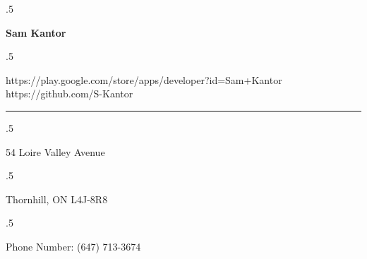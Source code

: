 \documentclass[article]{res}
\begin{document}
 \moveleft.5\hoffset\centerline{\Huge\bf Sam Kantor}
 \moveleft.5\hoffset\centerline{}
 \begin{changemargin}{-0.6cm}{0.5cm} 
 {https://play.google.com/store/apps/developer?id=Sam+Kantor \hspace{43 pt} https://github.com/S-Kantor}
  \end{changemargin}
\begin{changemargin}{-0.7cm}{2.5cm} 
 {\noindent\rule{17cm}{0.5pt} }
 \end{changemargin}


 \moveleft.5\hoffset\centerline{54 Loire Valley Avenue}
 \moveleft.5\hoffset\centerline{Thornhill, ON L4J-8R8}
 \moveleft.5\hoffset\centerline{Phone Number: (647) 713-3674}
\end{document}
